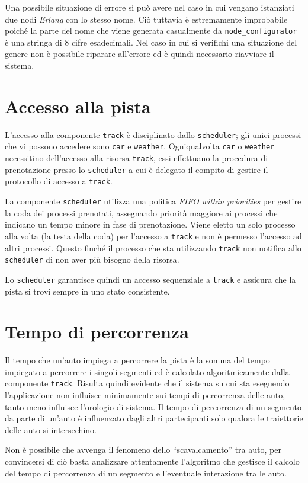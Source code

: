 \documentclass[a4paper]{report}
\newcommand{\Erlang}{\textsl{Erlang}}
\begin{document}
Una possibile situazione di errore si può avere nel caso in cui vengano istanziati due nodi \Erlang{} con lo stesso nome. Ciò tuttavia è estremamente improbabile poiché la parte del nome che viene generata casualmente da \texttt{node\_configurator} è una stringa di 8 cifre esadecimali. Nel caso in cui si verifichi una situazione del genere non è possibile riparare all'errore ed è quindi necessario riavviare il sistema.

\section{Accesso alla pista}
L'accesso alla componente \texttt{track} è disciplinato dallo \texttt{scheduler}; gli unici processi che vi possono accedere sono \texttt{car} e \texttt{weather}. Ogniqualvolta \texttt{car} o \texttt{weather} necessitino dell'accesso alla risorsa \texttt{track}, essi effettuano la procedura di prenotazione presso lo \texttt{scheduler} a cui è delegato il compito di gestire il protocollo di accesso a \texttt{track}.

La componente \texttt{scheduler} utilizza una politica \textit{FIFO within priorities} per gestire la coda dei processi prenotati, assegnando priorità maggiore ai processi che indicano un tempo minore in fase di prenotazione. Viene eletto un solo processo alla volta (la testa della coda) per l'accesso a \texttt{track} e non è permesso l'accesso ad altri processi. Questo finché il processo che sta utilizzando \texttt{track} non notifica allo \texttt{scheduler} di non aver più bisogno della risorsa.

Lo \texttt{scheduler} garantisce quindi un accesso sequenziale a \texttt{track} e assicura che la pista si trovi sempre in uno stato consistente.

\section{Tempo di percorrenza}
Il tempo che un'auto impiega a percorrere la pista è la somma del tempo impiegato a percorrere i singoli segmenti ed è calcolato algoritmicamente dalla componente \texttt{track}. Risulta quindi evidente che il sistema su cui sta eseguendo l'applicazione non influisce minimamente sui tempi di percorrenza delle auto, tanto meno influisce l'orologio di sistema. Il tempo di percorrenza di un segmento da parte di un'auto è influenzato dagli altri partecipanti solo qualora le traiettorie delle auto si intersechino.

Non è possibile che avvenga il fenomeno dello ``scavalcamento'' tra auto, per convincersi di ciò basta analizzare attentamente l'algoritmo che gestisce il calcolo del tempo di percorrenza di un segmento e l'eventuale interazione tra le auto.
\end{document}

